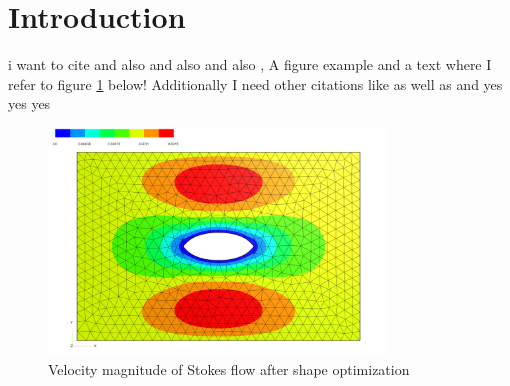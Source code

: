 \section{Introduction}


i want to cite \cite{fully_semi_paper_sturm}
and also \cite{vol_bary_constraint_paper} and also \cite{lecture_notes_sturm} and also \cite{nearly_conformal_paper}, 
A figure example and a text where I refer to figure \ref{shape_opt_plot} below! Additionally I need other citations like \cite{lecture_notes_faustmann_numPDE}
as well as \cite{lecture_notes_faustmann_AMF} and \cite{lecture_notes_melenk_numcomp}
yes yes yes
\begin{figure}[ht]
    \centering
    \includegraphics[width=0.8\textwidth]{figures/solution_shape_opt.PNG}
	\caption{Velocity magnitude of Stokes flow after shape optimization}
	\label{shape_opt_plot}
\end{figure}